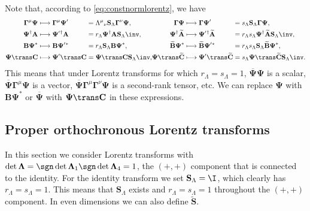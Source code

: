 \documentclass[11pt]{article}
\newcommand{\cc}{^\ast}
\newcommand{\hc}{^\dag}
\newcommand{\Gammab}{\boldsymbol{\Gamma}}
\renewcommand{\S}{\mathbf{S}}
\newcommand{\A}{\mathbf{A}}
\newcommand{\B}{\mathbf{B}}
\renewcommand{\C}{\mathbf{C}}
\newcommand{\At}{\widetilde{\A}}
\newcommand{\Bt}{\widetilde{\B}}
\newcommand{\Ct}{\widetilde{\C}}
\newcommand{\St}{\widetilde{\S}}
\newcommand{\Psib}{\boldsymbol{\Psi}}
\newcommand{\Lambdab}{\boldsymbol{\Lambda}}
\begin{document}
Note that, according to \cref{eq:constnormlorentz}, we have
%
\begin{equation}\label{eq:cclorentz}
\begin{alignedat}{4}
  \Gammab^\mu \Psib &\longmapsto \Gammab^\mu \Psib' &
    &= \Lambda^\mu{}_\nu \S_\Lambda \Gammab^\nu \Psib, &
  \Gammab \Psib &\longmapsto \Gammab \Psib' &
    &= s_\Lambda \S_\Lambda \Gammab \Psib, \\ 
  \Psib\hc \A &\longmapsto \Psib'{}\hc \A &
    &= r_\Lambda \Psib\hc \A \S_\Lambda\inv, & \qquad
  \Psib\hc \At &\longmapsto \Psib'{}\hc \At &
    &= r_\Lambda s_\Lambda \Psib\hc \At \S_\Lambda\inv, \\ 
  \B \Psib\cc &\longmapsto \B \Psib'{}\cc &
    &= r_\Lambda \S_\Lambda \B \Psib\cc, & 
  \Bt \Psib\cc &\longmapsto \Bt \Psib'{}\cc &
    &= r_\Lambda s_\Lambda \S_\Lambda \Bt \Psib\cc, \\ 
  \Psib\trans \C &\longmapsto \Psib'{}\trans \C &
    &= \Psib\trans \C \S_\Lambda\inv, &
  \Psib\trans \Ct &\longmapsto \Psib'{}\trans \Ct &
    &= s_\Lambda \Psib\trans \Ct \S_\Lambda\inv. \\ 
\end{alignedat}
\end{equation}
%
This means that under Lorentz transforms for which \(r_\Lambda = s_\Lambda = 1\), 
\(\overline{\Psib} \Psib\) is a scalar,
\(\overline{\Psib} \Gammab^\mu \Psib\) is a vector,
\(\overline{\Psib} \Gammab^\mu \Gammab^\nu \Psib\) is a second-rank tensor, etc.
We can replace \(\Psib\) with \(\B \Psib\cc\) or \(\overline{\Psib}\) with \(\Psib\trans \C\) in these expressions. 



\subsection{Proper orthochronous Lorentz transforms}\label{sec:properlorentz}

In this section we consider Lorentz transforms with \(\det \Lambdab = \sgn \det \Lambdab_1 \sgn \det \Lambdab_4 = 1\), \ie the \((+,+)\) component that is connected to the identity.
For the identity transform we set \(\S_\Lambda = \I\), which clearly has \(r_\Lambda = s_\Lambda = 1\).
This means that \(\S_\Lambda\) exists and \(r_\Lambda = s_\Lambda = 1\) throughout the \((+,+)\) component.
In even dimensions we can also define \(\St\).
\end{document}
